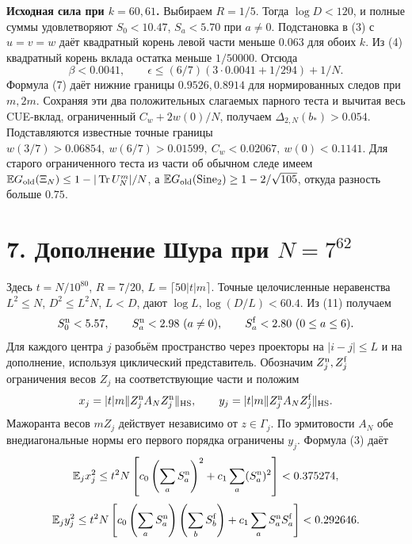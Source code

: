 \documentclass[11pt,a4paper]{article}
\newcommand{\Tr}{\operatorname{Tr}}
\newcommand{\EE}{\mathbb E}
\newcommand{\si}{\mathrm{Sine}_2}
\newcommand{\sect}[1]{\section*{\sffamily\color{ink}#1}}
\newcommand{\subt}[1]{\par\medskip\noindent\textbf{#1.}\quad}
\newcommand{\HS}{\mathrm{HS}}
\begin{document}
\subt{Исходная сила при \(k=60,61\)}
Выбираем \(R=1/5\). Тогда \(\log D<120\), и полные суммы удовлетворяют \(S_0<10.47\), \(S_a<5.70\) при \(a\ne0\). Подстановка в (3) с \(u=v=w\) даёт квадратный корень левой части меньше \(0.063\) для обоих \(k\). Из (4) квадратный корень вклада остатка меньше \(1/50000\). Отсюда
\[
          \beta<0.0041,\qquad
          \epsilon\le (6/7)(3\cdot0.0041+1/294)+1/N.
\]
Формула (7) даёт нижние границы \(0.9526,0.8914\) для нормированных следов при \(m,2m\). Сохраняя эти два положительных слагаемых парного теста и вычитая весь CUE-вклад, ограниченный \(C_w+2w(0)/N\), получаем \(\Delta_{2,N}(b_*)>0.054\). Подставляются известные точные границы \(w(3/7)>0.06854,\ w(6/7)>0.01599,\ C_w<0.02067,\ w(0)<0.1141\). Для старого ограниченного теста из части об обычном следе имеем \(\EE G_{\rm old}(\Xi_N)\le1-|\Tr U_N^m|/N\), а \(\EE G_{\rm old}(\si)\ge1-2/\sqrt{105}\), откуда разность больше \(0.75\).
\newpage
\sect{7. Дополнение Шура при \(N=7^{62}\)}
Здесь \(t=N/10^{80}\), \(R=7/20\), \(L=\lceil 50 |t|m\rceil\). Точные целочисленные неравенства \(L^2\le N\), \(D^2\le L^2N\), \(L<D\), дают \(\log L,\log(D/L)<60.4\). Из (11) получаем
\[
     S^{\rm n}_0<5.57,\qquad S^{\rm n}_a<2.98\ (a\ne0),\qquad
     S^{\rm f}_a<2.80\ (0\le a\le6).
\]
Для каждого центра \(j\) разобьём пространство через проекторы на \(|i-j|\le L\) и на дополнение, используя циклический представитель. Обозначим \(Z^{\rm n}_j,Z^{\rm f}_j\) ограничения весов \(Z_j\) на соответствующие части и положим
\[
 x_j=|t|m\|Z^{\rm n}_j A_N Z^{\rm n}_j\|_{\HS},\qquad
 y_j=|t|m\|Z^{\rm n}_j A_N Z^{\rm f}_j\|_{\HS}.
\]
Мажоранта весов \(mZ_j\) действует независимо от \(z\in\Gamma_j\). По эрмитовости \(A_N\) обе внедиагональные нормы его первого порядка ограничены \(y_j\). Формула (3) даёт
\[
 \EE_j x_j^2\le t^2 N\left[c_0\left(\sum_a S_a^{\rm n}\right)^2
                                 +c_1\sum_a(S_a^{\rm n})^2\right]<0.375274,
\]
\[
 \EE_j y_j^2\le t^2 N\left[c_0\left(\sum_a S_a^{\rm n}\right)
              \left(\sum_b S_b^{\rm f}\right)+c_1\sum_a S_a^{\rm n}S_a^{\rm f}\right]
                          <0.292646 .
\]
\end{document}
